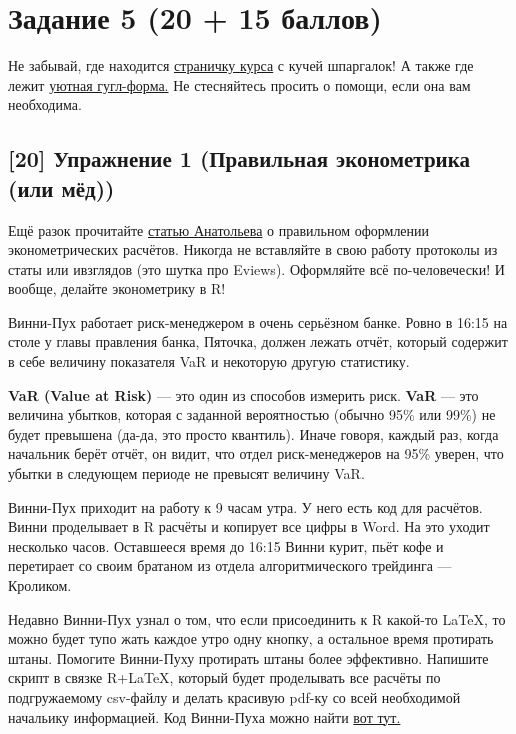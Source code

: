 \documentclass[12pt, a4paper, oneside]{article}
\begin{document}
\section*{Задание 5 (20 + 15 баллов)  }

Не забывай, где находится  \href{https://fulyankin.github.io/LaTeX/}{страничку курса} с кучей шпаргалок! А также где лежит \href{https://docs.google.com/forms/d/e/1FAIpQLSe11kxKVfv07iCL1E9yNX7ll9swKImiVwRr1H70lslGzInRSg/viewform}{уютная гугл-форма.} Не стесняйтесь просить о помощи, если она вам необходима. 

\subsection*{[20]   Упражнение 1 (Правильная эконометрика (или мёд)) }

Ещё разок прочитайте \href{https://github.com/FUlyankin/LaTeX/raw/master/Logi_2018/sem_5/Anatolyev.pdf}{статью Анатольева} о правильном оформлении эконометрических расчётов. Никогда не вставляйте в свою работу протоколы из статы или ивзглядов (это шутка про Eviews). Оформляйте всё по-человечески!  И вообще, делайте эконометрику в R!

Винни-Пух работает риск-менеджером в очень серьёзном банке. Ровно в 16:15 на столе у главы правления банка, Пяточка, должен лежать отчёт, который содержит в себе величину показателя VaR и некоторую другую статистику.

\textbf{VaR (Value at Risk)}  --- это один из способов измерить риск. \textbf{VaR} --- это величина убытков, которая с заданной вероятностью (обычно 95\% или 99\%) не будет превышена (да-да, это просто квантиль). Иначе говоря, каждый раз, когда начальник берёт отчёт, он видит, что отдел риск-менеджеров на 95\% уверен, что убытки в следующем периоде не превысят величину VaR.

Винни-Пух приходит на работу к 9 часам утра. У него есть код для расчётов. Винни проделывает в R расчёты и копирует все цифры в Word. На это уходит несколько часов. Оставшееся время до 16:15 Винни курит, пьёт кофе и перетирает со своим братаном из отдела алгоритмического трейдинга --- Кроликом.

Недавно Винни-Пух узнал о том, что если присоединить к R какой-то \LaTeX{}, то можно будет тупо жать каждое утро одну кнопку, а остальное время протирать штаны. Помогите Винни-Пуху протирать штаны более эффективно. Напишите скрипт в связке R+\LaTeX{}, который будет проделывать все расчёты по подгружаемому csv-файлу и делать красивую pdf-ку со всей необходимой начальику информацией.  Код Винни-Пуха можно найти \href{https://github.com/FUlyankin/LaTeX/blob/master/Logi_2018/Homework_2018/hw_5_script.R}{вот тут.}
\end{document}
